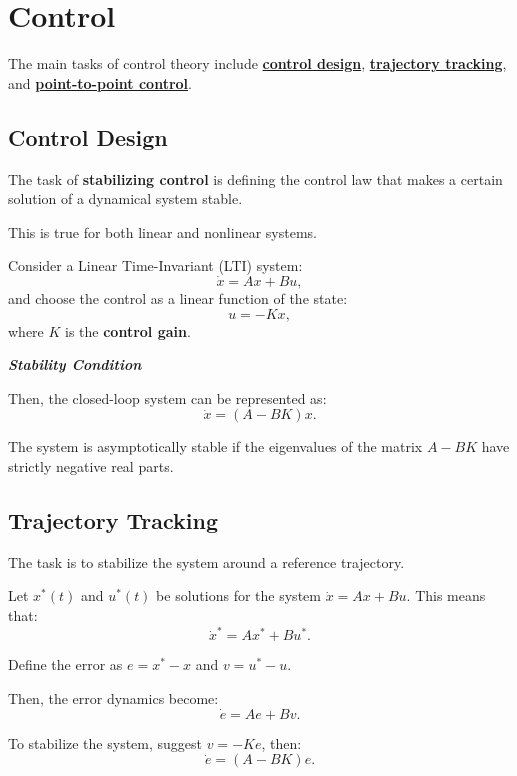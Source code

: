 \section{Control}

The main tasks of control theory include \textbf{\underline{control design}}, \textbf{\underline{trajectory tracking}}, and \textbf{\underline{point-to-point control}}.


\subsection{Control Design}

\begin{tcolorbox}[colback=green!10,colframe=green!50!black,title=\textbf{Dynamical Systems}]
    The task of \textbf{stabilizing control} is defining the control law that makes a certain solution of 
    a dynamical system stable.
\end{tcolorbox}

This is true for both linear and nonlinear systems.

Consider a Linear Time-Invariant (LTI) system:
\[\dot{x} = Ax + Bu,\]
and choose the control as a linear function of the state:
\[u = -Kx,\] where \(K\) is the \textbf{control gain}.

\begin{center}
    \textbf{\textit{Stability Condition}}
\end{center}

Then, the closed-loop system can be represented as:
\[\dot{x} = (A - BK)x.\]

The system is asymptotically stable if the eigenvalues of the matrix \(A - BK\) have strictly negative real parts.

\subsection{Trajectory Tracking}

The task is to stabilize the system around a reference trajectory.

Let \(x^*(t)\) and \(u^*(t)\) be solutions for the system \(\dot{x} = Ax + Bu\). This means that:
\[\dot{x}^* = Ax^* + Bu^*.\]

Define the error as \(e = x^* - x\) and \(v = u^* - u\).

Then, the error dynamics become:
\[\dot{e} = Ae + Bv.\]

To stabilize the system, suggest \(v = -Ke\), then:
\[\dot{e} = (A - BK)e.\]

